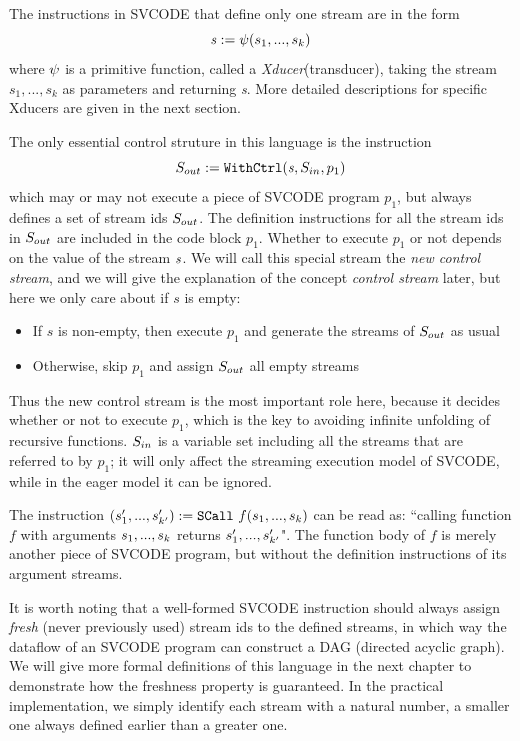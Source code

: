 The instructions in SVCODE that define only one stream are in the form
$$\sdef{\s}{\psi(s_1,...,s_k)} $$  
where $\lcall$ is a primitive function, called a \emph{Xducer}(transducer), taking the stream $s_1,...,s_k$ as parameters and returning \emph{s}. More detailed descriptions for specific Xducers are given in the next section.


The only essential control struture in this language is the \wc instruction 
$$\withctrl{\s}{p_1}{\Sin}{\Sout} $$
which may or may not execute a piece of SVCODE program $p_1$, but always defines a set of stream ids $\Sout$.
The definition instructions for all the stream ids in $\Sout$ are included in the code block $p_1$. 
Whether to execute $p_1$ or not depends on the value of the stream $\s$. We will call this special stream the \emph{new control stream}, and we will give the explanation of the concept \emph{control stream} later, but here we only care about if $s$ is empty:
\begin{itemize}
	\item If $s$ is non-empty, then execute $p_1$ and generate the streams of $\Sout$ as usual
	\item Otherwise, skip $p_1$ and assign $\Sout$ all empty streams 
\end{itemize}
Thus the new control stream is the most important role here, because it decides whether or not to execute $p_1$, which is the key to avoiding infinite unfolding of recursive functions.  
$\Sin$ is a variable set including all the streams that are referred to by $p_1$;
it will only affect the streaming execution model of SVCODE, while in the eager model it can be ignored.

The instruction $\scall{f}{\replc{k}{s}}{(\replc{k'}{s'})}$ can be read as: ``calling function $f$ with arguments $\replc{k}{s}$ returns $\replc{k'}{s'}$". 
The function body of $f$ is merely another piece of SVCODE program, but without the definition instructions of its argument streams.


It is worth noting that a well-formed SVCODE instruction should always assign \emph{fresh} (never previously used) stream ids to the defined streams, in which way the dataflow of an SVCODE program can construct a DAG (directed acyclic graph). 
We will give more formal definitions of this language in the next chapter
to demonstrate how the freshness property is guaranteed. 
In the practical implementation, we simply identify each stream with a natural number, a smaller one always defined earlier than a greater one. 


